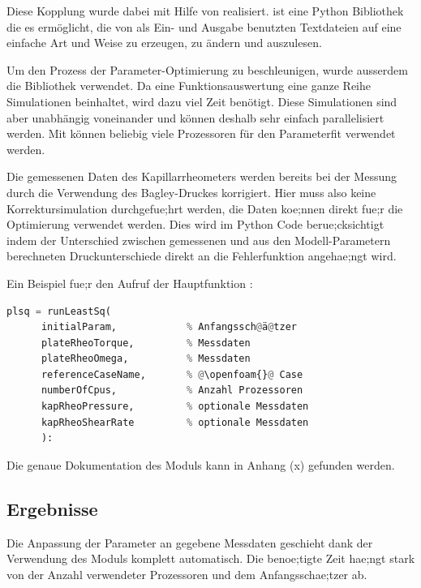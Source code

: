 Diese Kopplung wurde dabei mit Hilfe von   realisiert.  ist eine Python Bibliothek die es ermöglicht, die von \openfoam{} als Ein- und Ausgabe benutzten Textdateien auf eine einfache Art und Weise zu erzeugen, zu ändern und auszulesen.

Um den Prozess der Parameter-Optimierung zu beschleunigen, wurde ausserdem die Bibliothek   verwendet. Da eine Funktionsauswertung eine ganze Reihe Simulationen beinhaltet, wird dazu viel Zeit benötigt. Diese Simulationen sind aber unabhängig voneinander und können deshalb sehr einfach parallelisiert werden. Mit  können beliebig viele Prozessoren für den Parameterfit verwendet werden.

Die gemessenen Daten des Kapillarrheometers werden bereits bei der Messung durch die Verwendung des Bagley-Druckes korrigiert. Hier muss also keine Korrektursimulation durchgefue;hrt werden, die Daten koe;nnen direkt fue;r die Optimierung verwendet werden. Dies wird im Python Code berue;cksichtigt indem der Unterschied zwischen gemessenen und aus den Modell-Parametern berechneten Druckunterschiede direkt an die Fehlerfunktion angehae;ngt wird.

Ein Beispiel fue;r den Aufruf der Hauptfunktion :
\begin{lstlisting}[language=Python]
plsq = runLeastSq(
      initialParam,            % Anfangssch@ä@tzer
      plateRheoTorque,         % Messdaten
      plateRheoOmega,          % Messdaten
      referenceCaseName,       % @\openfoam{}@ Case
      numberOfCpus,            % Anzahl Prozessoren
      kapRheoPressure,         % optionale Messdaten
      kapRheoShearRate         % optionale Messdaten
      ):  
\end{lstlisting}
%
Die genaue Dokumentation des Moduls kann in Anhang (x)  gefunden werden.
%
\subsection{Ergebnisse}
Die Anpassung der Parameter an gegebene Messdaten geschieht dank der Verwendung des  Moduls komplett automatisch. 
Die benoe;tigte Zeit hae;ngt stark von der Anzahl verwendeter Prozessoren und dem Anfangsschae;tzer ab.
%
